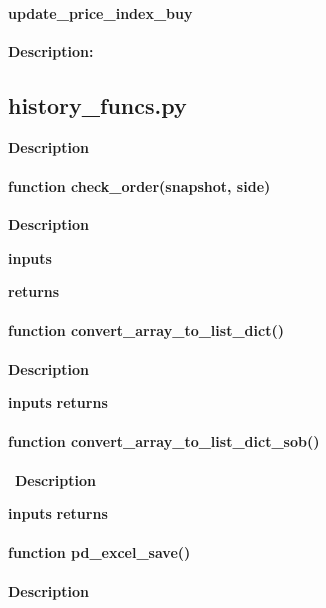 \documentclass[refman]{article}
\begin{document}



	






%



\paragraph{update\_price\_index\_buy}\hfill\break 
\noindent\textbf{Description:}


\subsection{history\_funcs.py}\hfill \break
\noindent \textbf{Description}



\paragraph{\textbf{function} check\_order(snapshot, side)}\hfill\break
\noindent \textbf{Description}

\noindent \textbf{inputs}

\noindent \textbf{returns}

\paragraph{\textbf{function} convert\_array\_to\_list\_dict()}\hfill\break
\noindent \textbf{Description}

\textbf{inputs}
\textbf{returns}

\paragraph{\textbf{function} convert\_array\_to\_list\_dict\_sob()}\hfill\
\noindent \textbf{Description}

\textbf{inputs}
\textbf{returns}

\paragraph{\textbf{function} pd\_excel\_save()}\hfill\break
\noindent \textbf{Description}
\end{document}
